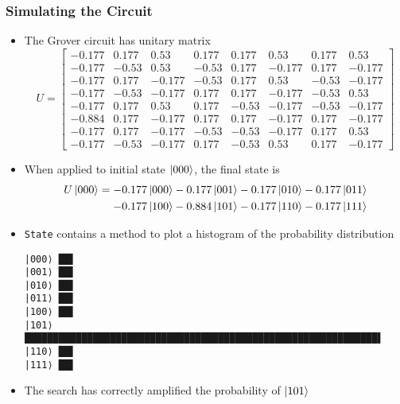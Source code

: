 \documentclass{beamer}
\begin{document}
\begin{frame}[fragile]
    \frametitle{Simulating the Circuit}
    \begin{itemize}
        \item The Grover circuit has unitary matrix
            {
                \tiny
                \begin{equation*}
                    U = \begin{bmatrix}
                        -0.177 &  0.177 &  0.53  &  0.177 &  0.177 &  0.53  &  0.177 &  0.53  \\
                        -0.177 & -0.53  &  0.53  & -0.53  &  0.177 & -0.177 &  0.177 & -0.177 \\
                        -0.177 &  0.177 & -0.177 & -0.53  &  0.177 &  0.53  & -0.53  & -0.177 \\
                        -0.177 & -0.53  & -0.177 &  0.177 &  0.177 & -0.177 & -0.53  &  0.53  \\
                        -0.177 &  0.177 &  0.53  &  0.177 & -0.53  & -0.177 & -0.53  & -0.177 \\
                        -0.884 &  0.177 & -0.177 &  0.177 &  0.177 & -0.177 &  0.177 & -0.177 \\
                        -0.177 &  0.177 & -0.177 & -0.53  & -0.53  & -0.177 &  0.177 &  0.53  \\
                        -0.177 & -0.53  & -0.177 &  0.177 & -0.53  &  0.53  &  0.177 & -0.177
                    \end{bmatrix}
                \end{equation*}
            }
        \item When applied to initial state $\ket{000}$, the final state is
            \begin{align*}
                U \ket{000} = -0.177 \ket{000} - 0.177 \ket{001} - 0.177 \ket{010} - 0.177 \ket{011} \\
                    - 0.177 \ket{100} - 0.884 \ket{101} - 0.177 \ket{110} - 0.177 \ket{111}
            \end{align*}
        \item \texttt{State} contains a method to plot a histogram of the probability distribution
            {
                \tiny
\begin{verbatim}
|000⟩ ██▌
|001⟩ ██▌
|010⟩ ██▌
|011⟩ ██▌
|100⟩ ██▌
|101⟩ ██████████████████████████████████████████████████████████████▌
|110⟩ ██▌
|111⟩ ██▌
\end{verbatim}
            }
        \item The search has correctly amplified the probability of $\ket{101}$
    \end{itemize}
\end{frame}
\end{document}

